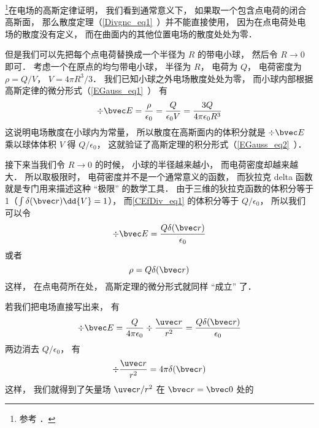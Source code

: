
\begin{issues}
\issueDraft
\end{issues}


\footnote{参考 \cite{GriffE}．}在电场的高斯定律证明， 我们看到通常意义下， 如果取一个包含点电荷的闭合高斯面， 那么散度定理（\autoref{Divgnc_eq1}~）并不能直接使用， 因为在点电荷处电场的散度没有定义， 而在曲面内的其他位置电场的散度处处为零．

但是我们可以先把每个点电荷替换成一个半径为 $R$ 的带电小球， 然后令 $R\to 0$ 即可． 考虑一个在原点的均匀带电小球， 半径为 $R$， 电荷为 $Q$， 电荷密度为 $\rho = Q/V$， $V = 4\pi R^3/3$． 我们已知小球之外电场散度处处为零， 而小球内部根据高斯定律的微分形式（\autoref{EGauss_eq1}~） 有
\begin{equation}\label{CEfDiv_eq1}
\div \bvec E = \frac{\rho}{\epsilon_0} = \frac{Q}{\epsilon_0 V} = \frac{3Q}{4\pi \epsilon_0 R^3}
\end{equation}
这说明电场散度在小球内为常量， 所以散度在高斯面内的体积分就是 $\div \bvec E$ 乘以球体体积 $V$ 得 $Q/\epsilon_0$， 这就验证了高斯定理的积分形式（\autoref{EGauss_eq2}~）．

接下来当我们令 $R\to 0$ 的时候， 小球的半径越来越小， 而电荷密度却越来越大． 所以取极限时， 电荷密度并不是一个通常意义的函数， 而狄拉克 delta 函数就是专门用来描述这种 “极限” 的数学工具． 由于三维的狄拉克函数的体积分等于 1（$\int \delta(\bvec r)\dd{V} = 1$）， 而\autoref{CEfDiv_eq1} 的体积分等于 $Q/\epsilon_0$， 所以我们可以令
\begin{equation}
\div \bvec E = \frac{Q\delta(\bvec r)}{\epsilon_0}
\end{equation}
或者
\begin{equation}
\rho = Q\delta(\bvec r)
\end{equation}
这样， 在点电荷所在处， 高斯定理的微分形式就同样 “成立” 了．

若我们把电场直接写出来， 有
\begin{equation}
\div \bvec E = \frac{Q}{4\pi\epsilon_0}\div \frac{\uvec r}{r^2} = \frac{Q\delta(\bvec r)}{\epsilon_0}
\end{equation}
两边消去 $Q/\epsilon_0$， 有
\begin{equation}
\div \frac{\uvec r}{r^2} = 4\pi\delta(\bvec r)
\end{equation}
这样， 我们就得到了矢量场 ${\uvec r}/{r^2}$ 在 $\bvec r = \bvec 0$ 处的



